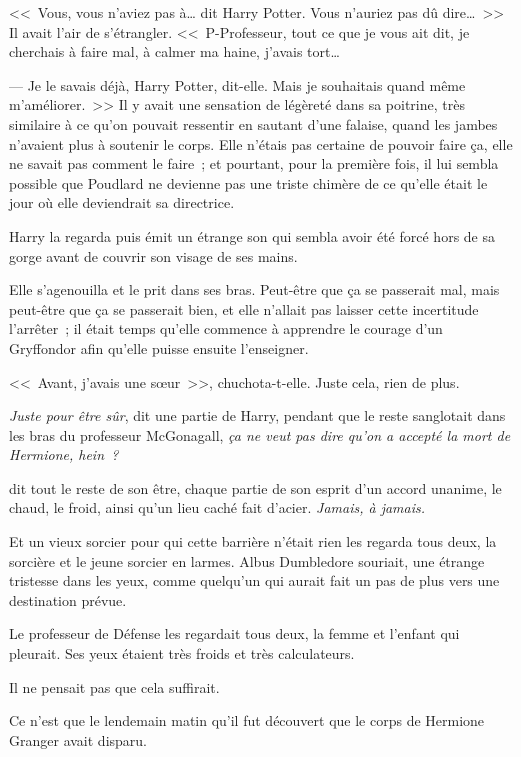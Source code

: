 <<~Vous, vous n'aviez pas à… dit Harry Potter. Vous n'auriez pas dû dire…~>> Il avait l'air de s'étrangler. <<~P-Professeur, tout ce que je vous ait dit, je cherchais à faire mal, à calmer ma haine, j'avais tort…

--- Je le savais déjà, Harry Potter, dit-elle. Mais je souhaitais quand même m'améliorer.~>> Il y avait une sensation de légèreté dans sa poitrine, très similaire à ce qu'on pouvait ressentir en sautant d'une falaise, quand les jambes n'avaient plus à soutenir le corps. Elle n'étais pas certaine de pouvoir faire ça, elle ne savait pas comment le faire~; et pourtant, pour la première fois, il lui sembla possible que Poudlard ne devienne pas une triste chimère de ce qu'elle était le jour où elle deviendrait sa directrice.

Harry la regarda puis émit un étrange son qui sembla avoir été forcé hors de sa gorge avant de couvrir son visage de ses mains.

Elle s'agenouilla et le prit dans ses bras. Peut-être que ça se passerait mal, mais peut-être que ça se passerait bien, et elle n'allait pas laisser cette incertitude l'arrêter~; il était temps qu'elle commence à apprendre le courage d'un Gryffondor afin qu'elle puisse ensuite l'enseigner.

<<~Avant, j'avais une sœur~>>, chuchota-t-elle. Juste cela, rien de plus.

\later

\emph{Juste pour être sûr}, dit une partie de Harry, pendant que le reste sanglotait dans les bras du professeur McGonagall, \emph{ça ne veut pas dire qu'on a accepté la mort de Hermione, hein~?}

\emph{} dit tout le reste de son être, chaque partie de son esprit d'un accord unanime, le chaud, le froid, ainsi qu'un lieu caché fait d'acier. \emph{Jamais, à jamais.}

\later

Et un vieux sorcier pour qui cette barrière n'était rien les regarda tous deux, la sorcière et le jeune sorcier en larmes. Albus Dumbledore souriait, une étrange tristesse dans les yeux, comme quelqu'un qui aurait fait un pas de plus vers une destination prévue.

\later

Le professeur de Défense les regardait tous deux, la femme et l'enfant qui pleurait. Ses yeux étaient très froids et très calculateurs.

Il ne pensait pas que cela suffirait.

\later

Ce n'est que le lendemain matin qu'il fut découvert que le corps de Hermione Granger avait disparu.
